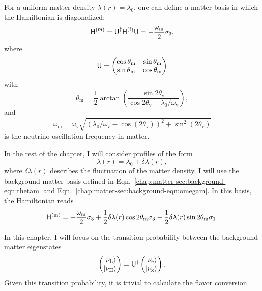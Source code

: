 For a uniform matter density $\lambda(r) = \lambda_0$, one can define a matter basis in which the Hamiltonian is diagonalized:
\begin{equation}
\mathsf H^{(\mathrm m)}  = \mathsf U^\dagger \mathsf H^{(\mathrm f)} \mathsf U = -\frac{\omega_\mathrm m}{2} \sigma_3,
\end{equation}
where
\begin{equation}
\mathsf U = \begin{pmatrix}
\cos \theta_\mathrm m & \sin \theta_\mathrm m \\
\sin\theta_\mathrm m & \cos \theta_\mathrm m
\end{pmatrix}
\end{equation}
with
\begin{equation*}
\theta_{\mathrm{m}}= \frac{1}{2} \arctan\left(
\frac{\sin 2\theta_{\mathrm v}}{ \cos 2\theta_{\mathrm v} - \lambda_0/\omega_{\mathrm v} } \right),
\label{chap:matter-sec:background-eqn:thetam}
\end{equation*}
and
\begin{equation}
\omega_{\mathrm{m}} = \omega_{\mathrm{v}} \sqrt{ ( \lambda_0/\omega_{\mathrm{v}} - \cos (2\theta_{\mathrm{v}}) )^2 + \sin^2(2\theta_{\mathrm{v}}) }
\label{chap:matter-sec:background-eqn:omegam}
\end{equation}
is the neutrino oscillation frequency in matter.

In the rest of the chapter, I will consider profiles of the form
\begin{equation}
    \lambda(r) = \lambda_0 + \delta \lambda(r),
    \label{eq-general-matter-profile}
\end{equation}
where $\delta \lambda(r)$ describes the fluctuation of the matter density. I will use the background matter basis defined in Eqn.~\ref{chap:matter-sec:background-eqn:thetam} and Eqn.~\ref{chap:matter-sec:background-eqn:omegam}. In this basis, the Hamiltonian reads
\begin{equation}
    \mathsf H^{(\mathrm{m})} = -\frac{\omega_\mm}{2} \sigma_3 + \frac{1}{2} \delta\lambda(r) \cos 2\theta_{\mathrm m} \sigma_3
     - \frac{1}{2} \delta\lambda(r) \sin 2\theta_{\mathrm m} \sigma_1.
    \label{eq-hamiltonian-bg-matter-basis-general}
\end{equation}

In this chapter, I will focus on the transition probability between the background matter eigenstates
\begin{equation}
    \begin{pmatrix}
        \left| \nu_{\mathrm L}\right\rangle \\
        \left| \nu_{\mathrm H}\right\rangle
    \end{pmatrix} = \mathsf U^\dagger \begin{pmatrix}
        \left| \nu_{\mathrm e}\right\rangle \\
        \left| \nu_{\mathrm x}\right\rangle
    \end{pmatrix}.
\end{equation}
Given this transition probability, it is trivial to calculate the flavor conversion.

